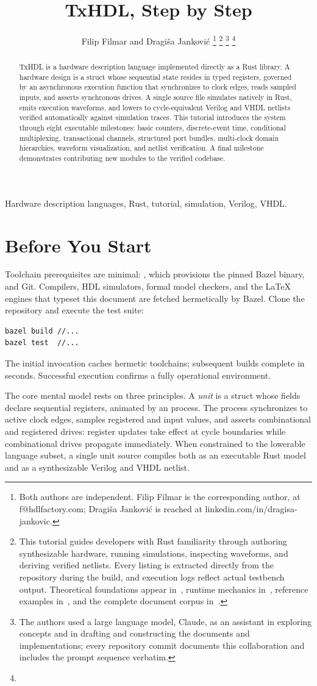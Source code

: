 \documentclass[journal,9pt]{IEEEtran}
\title{TxHDL, Step by Step}
\author{Filip Filmar and Dragiša Janković%
\thanks{Both authors are independent. Filip Filmar is the
corresponding author, at f@hdlfactory.com; Dragiša Janković is
reached at linkedin.com/in/dragisa-jankovic.}%
\thanks{This tutorial guides developers with Rust familiarity through
authoring synthesizable hardware, running simulations, inspecting waveforms,
and deriving verified netlists. Every listing is extracted directly from the
repository \code{HDL/txhdl} during the build, and execution logs reflect actual
testbench output. Theoretical foundations appear in~\cite{embedding}, runtime
mechanics in~\cite{runtime}, reference examples in~\cite{examples}, and the
complete document corpus in~\cite{cover}.}%
\thanks{The authors used a large language model, Claude, as an
assistant in exploring concepts and in drafting and constructing
the documents and implementations; every repository commit documents
this collaboration and includes the prompt sequence verbatim.}%
\thanks{\buildstamp}}
\begin{document}
\maketitle

\begin{abstract}
TxHDL is a hardware description language implemented directly as a Rust
library. A hardware design is a struct whose sequential state resides in typed
registers, governed by an asynchronous execution function that synchronizes to
clock edges, reads sampled inputs, and asserts synchronous drives. A single
source file simulates natively in Rust, emits execution waveforms, and lowers to
cycle-equivalent Verilog and VHDL netlists verified automatically against
simulation traces. This tutorial introduces the system through eight executable
milestones: basic counters, discrete-event time, conditional multiplexing,
transactional channels, structured port bundles, multi-clock domain
hierarchies, waveform visualization, and netlist verification. A final
milestone demonstrates contributing new modules to the verified codebase.
\end{abstract}

\begin{IEEEkeywords}
Hardware description languages, Rust, tutorial, simulation, Verilog,
VHDL.
\end{IEEEkeywords}

\section{Before You Start}
\label{sec:t-start}

Toolchain prerequisites are minimal: , which provisions the
pinned Bazel binary, and Git. Compilers, HDL simulators, formal model
checkers, and the \LaTeX{} engines that typeset this document are fetched
hermetically by Bazel. Clone the repository and execute the test suite:

\begin{lstlisting}[style=ascii]
bazel build //...
bazel test  //...
\end{lstlisting}

The initial invocation caches hermetic toolchains; subsequent builds complete in
seconds. Successful execution confirms a fully operational environment.

The core mental model rests on three principles. A \emph{unit} is a struct whose
fields declare sequential registers, animated by an  process.
The process synchronizes to active clock edges, samples registered and input
values, and asserts combinational and registered drives: register updates take
effect at cycle boundaries while combinational drives propagate immediately.
When constrained to the lowerable language subset, a single unit source compiles
both as an executable Rust model and as a synthesizable Verilog and VHDL
netlist.
\end{document}
